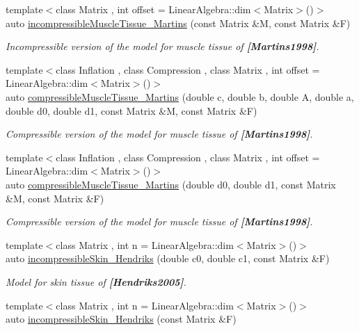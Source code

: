 \begin{DoxyCompactItemize}
{\footnotesize template$<$class Matrix , int offset = Linear\+Algebra\+::dim$<$\+Matrix$>$()$>$ }\\auto \hyperlink{group__Biomechanics_ga9e414585a90b1988e9fa88d17d875055}{incompressible\+Muscle\+Tissue\+\_\+\+Martins} (const Matrix \&M, const Matrix \&F)
\begin{DoxyCompactList}\small\item\em Incompressible version of the model for muscle tissue of {\bfseries [Martins1998]}. \end{DoxyCompactList}\item 
{\footnotesize template$<$class Inflation , class Compression , class Matrix , int offset = Linear\+Algebra\+::dim$<$\+Matrix$>$()$>$ }\\auto \hyperlink{group__Biomechanics_gad831914c493a3da04ed40c3c0ce87a62}{compressible\+Muscle\+Tissue\+\_\+\+Martins} (double c, double b, double A, double a, double d0, double d1, const Matrix \&M, const Matrix \&F)
\begin{DoxyCompactList}\small\item\em Compressible version of the model for muscle tissue of {\bfseries [Martins1998]}. \end{DoxyCompactList}\item 
{\footnotesize template$<$class Inflation , class Compression , class Matrix , int offset = Linear\+Algebra\+::dim$<$\+Matrix$>$()$>$ }\\auto \hyperlink{group__Biomechanics_ga46a70ccb2285e12addad87b6a8aaaae8}{compressible\+Muscle\+Tissue\+\_\+\+Martins} (double d0, double d1, const Matrix \&M, const Matrix \&F)
\begin{DoxyCompactList}\small\item\em Compressible version of the model for muscle tissue of {\bfseries [Martins1998]}. \end{DoxyCompactList}\item 
{\footnotesize template$<$class Matrix , int n = Linear\+Algebra\+::dim$<$\+Matrix$>$()$>$ }\\auto \hyperlink{group__Biomechanics_gaa20bf15ef6976d64d89490429035b2c4}{incompressible\+Skin\+\_\+\+Hendriks} (double c0, double c1, const Matrix \&F)
\begin{DoxyCompactList}\small\item\em Model for skin tissue of {\bfseries [Hendriks2005]}. \end{DoxyCompactList}\item 
{\footnotesize template$<$class Matrix , int n = Linear\+Algebra\+::dim$<$\+Matrix$>$()$>$ }\\auto \hyperlink{group__Biomechanics_gad8653218bd2afb4e3cfd601a5142956c}{incompressible\+Skin\+\_\+\+Hendriks} (const Matrix \&F)

\end{DoxyCompactItemize}
